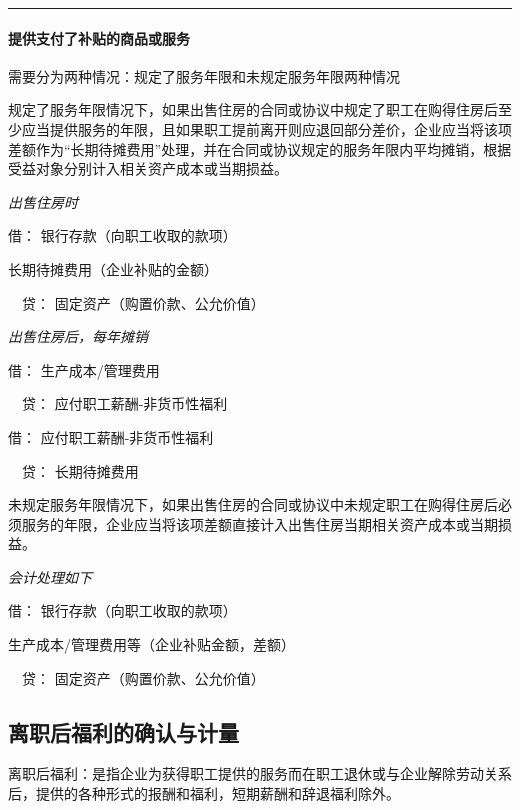\documentclass[UTF8,12pt]{ctexart}
\newenvironment{Dr}{\noindent 借：}{\par}
\newenvironment{Cr}{\noindent \ \ 贷：}{\par}
\numberwithin{equation}{section} %
\numberwithin{figure}{section}
\numberwithin{table}{section}
\begin{document}
	\vspace{5pt}
	\hrule
	\vspace{5pt}


	\paragraph{提供支付了补贴的商品或服务}
	需要分为两种情况：规定了服务年限和未规定服务年限两种情况
	
	规定了服务年限情况下，如果出售住房的合同或协议中规定了职工在购得住房后至少应当提供服务的年限，且如果职工提前离开则应退回部分差价，企业应当将该项差额作为“长期待摊费用”处理，并在合同或协议规定的服务年限内平均摊销，根据受益对象分别计入相关资产成本或当期损益。
	
	\textit{出售住房时}
	
	\begin{Dr}
		银行存款（向职工收取的款项）
		
		长期待摊费用（企业补贴的金额）
	\end{Dr}
	\begin{Cr}
		固定资产（购置价款、公允价值） 
	\end{Cr}
	
	\textit{出售住房后，每年摊销}
	
	\begin{Dr}
		生产成本/管理费用
	\end{Dr}
	\begin{Cr}
		应付职工薪酬-非货币性福利
	\end{Cr}
	
	\begin{Dr}
		应付职工薪酬-非货币性福利
	\end{Dr}
	\begin{Cr}
		长期待摊费用
	\end{Cr}

	未规定服务年限情况下，如果出售住房的合同或协议中未规定职工在购得住房后必须服务的年限，企业应当将该项差额直接计入出售住房当期相关资产成本或当期损益。
	
	\textit{会计处理如下}
	
	\begin{Dr}
		银行存款（向职工收取的款项）
		
		生产成本/管理费用等（企业补贴金额，差额） 
	\end{Dr}
	\begin{Cr}
		固定资产（购置价款、公允价值）
	\end{Cr}
	
	\subsection{离职后福利的确认与计量}
	离职后福利：是指企业为获得职工提供的服务而在职工退休或与企业解除劳动关系后，提供的各种形式的报酬和福利，短期薪酬和辞退福利除外。
	
\end{document}
